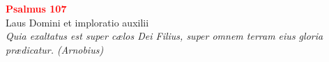 


\def\greinitialformat#1{%
{\fontsize{39}{39}\selectfont #1}%
}




\vspace{0.3cm}
\begin{center}
 \textcolor{red}{\large \bf Psalmus 107}\\
Laus Domini et imploratio auxilii\\
\textit{\small Quia exaltatus est super cælos Dei Filius, super omnem terram eius gloria prædicatur. (Arnobius)}
\end{center}

